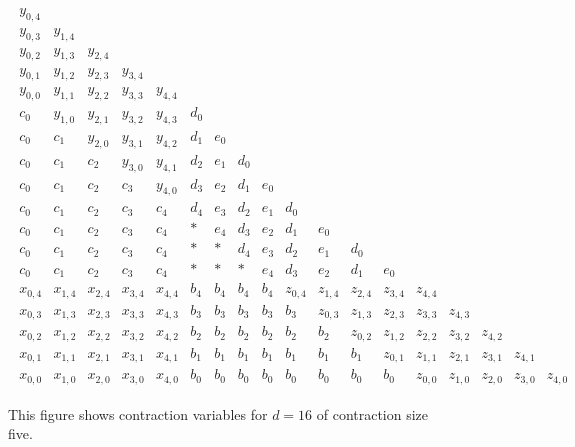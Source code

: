 \begin{figure}
    \begin{align*}
        \begin{array}{cccccccccccccccccccc}
            y_{0,4} & & & & & & & & & & & & \\
            y_{0,3} & y_{1,4} & & & & & & & & & & & \\
            y_{0,2} & y_{1,3} & y_{2,4} & & & & & & & & & & \\
            y_{0,1} & y_{1,2} & y_{2,3} & y_{3,4} & & & & & & & & & \\
            y_{0,0} & y_{1,1} & y_{2,2} & y_{3,3} & y_{4,4} & & & & & & & & \\
            c_0 & y_{1,0} & y_{2,1} & y_{3,2} & y_{4,3} & d_0 & & & & & & & \\
            c_0 & c_1 & y_{2,0} & y_{3,1} & y_{4,2} & d_1 & e_0 & & & & & & \\
            c_0 & c_1 & c_2 & y_{3,0} & y_{4,1} & d_2 & e_1 & d_0 & & & & & \\
            c_0 & c_1 & c_2 & c_3 &  y_{4,0}  & d_3 & e_2 & d_1 & e_0 & & & & \\
            c_0 & c_1 & c_2 & c_3 &  c_4  & d_4 & e_3 & d_2 & e_1 & d_0 & & & \\
            c_0 & c_1 & c_2 & c_3 &  c_4  & * & e_4 & d_3 & e_2 & d_1 & e_0 & & \\
            c_0 & c_1 & c_2 & c_3 &  c_4  & * & * & d_4 & e_3 & d_2 & e_1 & d_0 & \\
            c_0 & c_1 & c_2 & c_3 &  c_4  & * & * & * & e_4 & d_3 & e_2 & d_1 & e_0 \\
            x_{0,4} & x_{1,4} & x_{2,4} & x_{3,4} &  x_{4,4}  & b_4 & b_4 & b_4 & b_4 & z_{0,4} & z_{1,4} & z_{2,4} & z_{3,4} & z_{4,4} \\
            x_{0,3} & x_{1,3} & x_{2,3} & x_{3,3} & x_{4,3} & b_3 & b_3 & b_3 & b_3 & b_3 & z_{0,3} & z_{1,3} & z_{2,3} & z_{3,3} & z_{4,3} \\
            x_{0,2} & x_{1,2} & x_{2,2} & x_{3,2} & x_{4,2} & b_2 & b_2 & b_2 & b_2 & b_2 & b_2 & z_{0,2} & z_{1,2} & z_{2,2} & z_{3,2} & z_{4,2}\\
            x_{0,1} & x_{1,1} & x_{2,1} & x_{3,1} & x_{4,1} & b_1 & b_1 & b_1 & b_1 & b_1 & b_1 & b_1 & z_{0,1} & z_{1,1} & z_{2,1} & z_{3,1} & z_{4,1} \\
            x_{0,0} & x_{1,0} & x_{2,0} & x_{3,0} & x_{4,0} & b_0 & b_0 & b_0 & b_0 & b_0 & b_0 & b_0 & b_0 & z_{0,0} & z_{1,0} & z_{2,0} & z_{3,0} & z_{4,0}
        \end{array}
    \end{align*}  
    \caption{This figure shows contraction variables for \( d = 16 \) of contraction size five.}\label{fig:sjdnfkjewnjhwurhi3u2h}
\end{figure}


